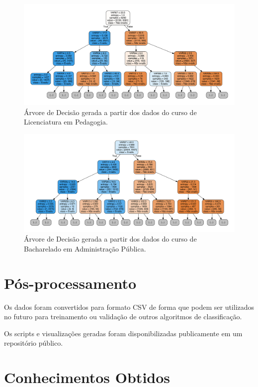 \begin{figure}[!htb]
  \centering
  \caption{\label{treePed} Árvore de Decisão gerada a partir dos dados do curso de Licenciatura em Pedagogia.}
  \includegraphics[angle=-90,scale=.50]{img/ped_tree}
  \Ididthis
\end{figure}

\begin{figure}[!htb]
  \centering
  \caption{\label{treeAdm} Árvore de Decisão gerada a partir dos dados do curso de Bacharelado em Administração Pública.}
  \includegraphics[angle=-90,scale=.50]{img/adm_tree}
  \Ididthis
\end{figure}


\section{Pós-processamento}

Os dados foram convertidos para formato CSV de forma que podem ser utilizados no
futuro para treinamento ou validação de outros algoritmos de classificação.

Os  scripts e visualizações geradas foram disponibilizadas publicamente em um
repositório público.

\section{Conhecimentos Obtidos}

